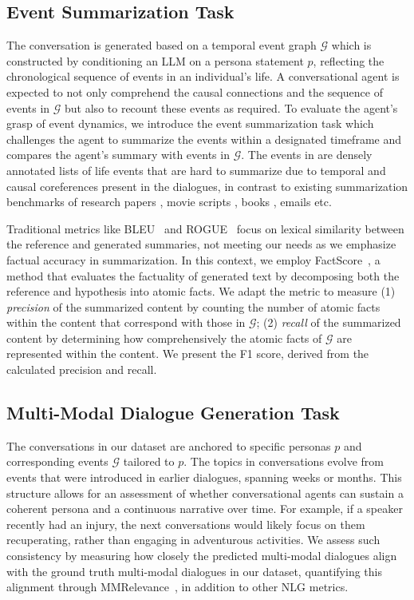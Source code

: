 \subsection{Event Summarization Task}
\label{ssec:benchmark-event}
The conversation is generated based on a temporal event graph $\mathcal{G}$ which is constructed by conditioning an LLM on a persona statement $p$, reflecting the chronological sequence of events in an individual's life.
A conversational agent is expected to not only comprehend the causal connections and the sequence of events in $\mathcal{G}$ but also to recount these events as required.
To evaluate the agent's grasp of event dynamics, we introduce the event summarization task which challenges the agent to summarize the events within a designated timeframe and compares the agent's summary with events in $\mathcal{G}$. The events in \dataset{} are densely annotated lists of life events that are hard to summarize due to temporal and causal coreferences present in the dialogues, in contrast to existing summarization benchmarks of research papers \cite{li2023loogle}, movie scripts \cite{chen2022summscreen}, books \cite{kryscinski2022booksum}, emails \cite{zhang2021emailsum} etc.


Traditional metrics like BLEU~\cite{papineni-etal-2002-bleu} and ROGUE~\cite{lin-2004-rouge} focus on lexical similarity between the reference and generated summaries, not meeting our needs as we emphasize factual accuracy in summarization.
In this context, we employ FactScore~\cite{min2023factscore}, a method that evaluates the factuality of generated text by decomposing both the reference and hypothesis into atomic facts.
We adapt the metric to measure
(1) \textit{precision} of the summarized content by counting the number of atomic facts within the content that correspond with those in $\mathcal{G}$;
(2) \textit{recall} of the summarized content by determining how comprehensively the atomic facts of $\mathcal{G}$ are represented within the content.
We present the F1 score, derived from the calculated precision and recall.


\subsection{Multi-Modal Dialogue Generation Task}
\label{ssec:benchmark-mm}
The conversations in our dataset are anchored to specific personas $p$ and corresponding events $\mathcal{G}$ tailored to $p$.
The topics in conversations evolve from events that were introduced in earlier dialogues, spanning weeks or months.
This structure allows for an assessment of whether conversational agents can sustain a coherent persona and a continuous narrative over time.
For example, if a speaker recently had an injury, the next conversations would likely focus on them recuperating, rather than engaging in adventurous activities.
We assess such consistency by measuring how closely the predicted multi-modal dialogues align with the ground truth multi-modal dialogues in our dataset, quantifying this alignment through MMRelevance~\cite{feng2023mmdialog}, in addition to other NLG metrics.